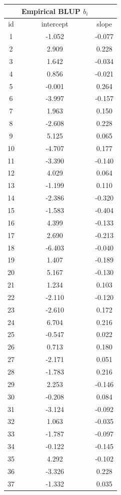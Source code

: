 \documentclass{article}
\begin{document}
\begin{flushleft}
\begin{tabular}{ccc}
\hline
&Empirical BLUP $b_i$\\
\hline
id & intercept & slope \\ 
\hline
1 & -1.052 & -0.077 \\ 
2 & 2.909 & 0.228 \\ 
3 & 1.642 & -0.034 \\ 
4 & 0.856 & -0.021 \\ 
5 & -0.001 & 0.264 \\ 
6 & -3.997 & -0.157 \\ 
7 & 1.963 & 0.150 \\ 
8 & -2.608 & 0.228 \\ 
9 & 5.125 & 0.065 \\ 
10 & -4.707 & 0.177 \\ 
11 & -3.390 & -0.140 \\ 
12 & 4.029 & 0.064 \\ 
13 & -1.199 & 0.110 \\ 
14 & -2.386 & -0.320 \\ 
15 & -1.583 & -0.404 \\ 
16 & 4.399 & -0.133 \\ 
17 & 2.690 & -0.213 \\ 
18 & -6.403 & -0.040 \\ 
19 & 1.407 & -0.189 \\ 
20 & 5.167 & -0.130 \\ 
21 & 1.234 & 0.103 \\ 
22 & -2.110 & -0.120 \\ 
23 & -2.610 & 0.172 \\ 
24 & 6.704 & 0.216 \\ 
25 & -0.547 & 0.022 \\ 
26 & 0.713 & 0.180 \\ 
27 & -2.171 & 0.051 \\ 
28 & -1.783 & 0.216 \\ 
29 & 2.253 & -0.146 \\ 
30 & -0.208 & 0.084 \\ 
31 & -3.124 & -0.092 \\ 
32 & 1.063 & -0.035 \\ 
33 & -1.787 & -0.097 \\ 
34 & -0.122 & -0.145 \\ 
35 & 4.292 & -0.102 \\ 
36 & -3.326 & 0.228 \\ 
37 & -1.332 & 0.035 \\ 
\hline
\end{tabular}\medbreak

\end{flushleft}
\end{document}
